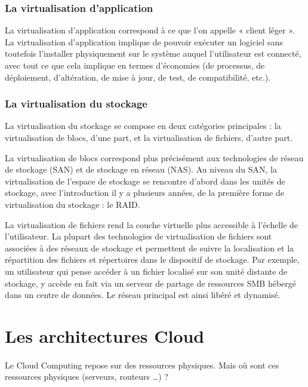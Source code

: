 \documentclass[a4paper,12pt]{report}
\begin{document}
\begin{onehalfspace}
	\subsubsection{La virtualisation d'application}
	La virtualisation d'application correspond à ce que l'on appelle « client léger ». La virtualisation d'application implique de pouvoir exécuter un logiciel sans toutefois l'installer physiquement sur le système auquel l'utilisateur est connecté, avec tout ce que cela implique en termes d'économies (de processus, de déploiement, d'altération, de mise à jour, de test, de compatibilité, etc.).  
	
	\subsubsection{La virtualisation du stockage}
	La virtualisation du stockage se compose en deux catégories principales : la virtualisation de blocs, d'une part, et la virtualisation de fichiers, d'autre part. 
	
	La virtualisation de blocs correspond plus précisément aux technologies de réseau de stockage 
(SAN) et de stockage en réseau (NAS). Au niveau du SAN, la virtualisation de l'espace de stockage se rencontre d'abord dans les unités de stockage, avec l'introduction il y a plusieurs années, de la première forme de virtualisation du stockage : le RAID.
 
	La virtualisation de fichiers rend la couche virtuelle plus accessible à l'échelle de l'utilisateur. La plupart des technologies de virtualisation de fichiers sont associées à des réseaux de stockage et permettent de suivre la localisation et la répartition des fichiers et répertoires dans 
le dispositif de stockage. Par exemple, un utilisateur qui pense accéder à un fichier localisé sur 
son unité distante de stockage, y accède en fait via un serveur de partage de ressources SMB hébergé dans un centre de données. Le réseau principal est ainsi libéré et dynamisé.  
	
	\section{Les architectures Cloud}

	\paragraph*{}
	Le Cloud Computing repose sur des ressources physiques. Mais où sont ces ressources physiques (serveurs, routeurs …) ?
	

\end{onehalfspace}
\end{document}
